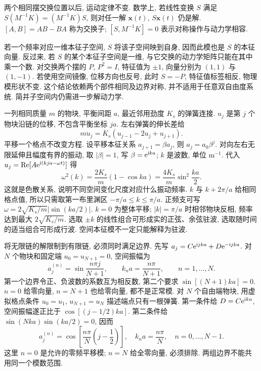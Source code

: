 \label{ch:chain}
两个相同摆交换位置以后, 运动定律不变. 数学上, 若线性变换 $S$ 满足 $S(M^{-1}K)=(M^{-1}K)S$, 则对任一解 $\boldsymbol x(t)$, $S\boldsymbol x(t)$ 仍是解. $[A,B]=AB-BA$ 称为交换子; $[S,M^{-1}K]=0$ 表示对称操作与动力学相容.

若一个频率对应一维本征子空间, $S$ 将该子空间映到自身, 因而此模也是 $S$ 的本征向量. 反过来, 若 $S$ 的某个本征子空间是一维, 与它交换的动力学矩阵只能在其中乘一个数. 对交换两个摆的 $P$, $P^2=I$, 特征值为 $\pm1$, 向量分别为 $(1,1)$ 与 $(1,-1)$. 若使用空间镜像, 位移方向也反号, 此时 $S=-P$, 特征值标签相反, 物理模形状不变. 这个结论依赖两个部件相同及边界对称, 并不适用于任意双自由度系统. 简并子空间内仍需进一步解动力学.

一列相同质量 $m$ 的物块, 平衡间距 $a$, 最近邻用劲度 $K_s$ 的弹簧连接. $u_j$ 是第 $j$ 个物块沿链的位移, 不包含平衡坐标 $ja$. 左右弹簧的伸长差给
\begin{equation}\label{eq:discrete}
m\ddot u_j=K_s(u_{j-1}-2u_j+u_{j+1}).
\end{equation}
平移一个格点不改变方程. 设平移本征关系 $a_{j+1}=\beta a_j$, 则 $a_j=a_0\beta^j$. 对向左右无限延伸且幅度有界的振动, 取 $|\beta|=1$, 写 $\beta=\mathrm e^{\mathrm i ka}$; $k$ 是波数, 单位 $\mathrm{m}^{-1}$. 代入 $u_j=\operatorname{Re}[A\mathrm e^{\mathrm i(kja-\omega t)}]$ 得
\begin{equation}\label{eq:chain-dispersion}
\omega^2(k)=\frac{2K_s}{m}(1-\cos ka)
=\frac{4K_s}{m}\sin^2\frac{ka}{2}.
\end{equation}
这就是色散关系, 说明不同空间变化尺度对应什么振动频率. $k$ 与 $k+2\pi/a$ 给相同格点值, 所以只需取第一布里渊区 $-\pi/a\le k\le\pi/a$. 正频支可写 $\omega=2\sqrt{K_s/m}|\sin(ka/2)|$. $k=0$ 为整体平移; $|k|=\pi/a$ 时相邻物块反相, 频率达到最大 $2\sqrt{K_s/m}$. 选取 $\pm k$ 的线性组合可形成实的正弦、余弦驻波, 选取随时间的适当组合可形成行波. 空间本征模不一定只能解释为驻波.

将无限链的解限制到有限链, 必须同时满足边界. 先写 $a_j=C\mathrm e^{\mathrm i jka}+D\mathrm e^{-\mathrm i jka}$. 对 $N$ 个物块和固定端 $u_0=u_{N+1}=0$, 空间振幅为
\[
a_j^{(n)}=\sin\frac{n\pi j}{N+1},\qquad
k_na=\frac{n\pi}{N+1},\qquad n=1,\ldots,N.
\]
第一个边界令正、负波数的系数互为相反数, 第二个要求 $\sin[(N+1)ka]=0$. $n=0$ 给零向量, $n=N+1$ 也给零向量, 都不是正常模. 对 $N$ 个自由端物块, 用虚拟格点条件 $u_0=u_1$, $u_{N+1}=u_N$ 描述端点只有一根弹簧. 第一条件给 $D=C\mathrm e^{\mathrm i ka}$, 空间振幅遂正比于 $\cos[(j-1/2)ka]$. 第二条件给 $\sin(Nka)\sin(ka/2)=0$, 因而
\[
a_j^{(n)}=\cos\left[\frac{n\pi}{N}\left(j-\frac12\right)\right],\quad
k_na=\frac{n\pi}{N},\quad n=0,\ldots,N-1.
\]
这里 $n=0$ 是允许的零频平移模; $n=N$ 给全零向量, 必须排除. 两组边界不能共用同一个模数范围.

